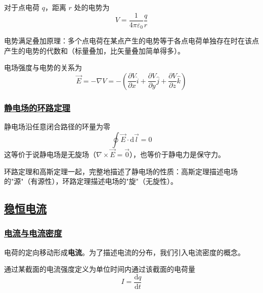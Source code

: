 对于点电荷 $q$，距离 $r$ 处的电势为
\begin{equation}
    V = \frac{1}{4\pi\varepsilon_0}\frac{q}{r}
\end{equation}

电势满足叠加原理：多个点电荷在某点产生的电势等于各点电荷单独存在时在该点产生的电势的代数和（标量叠加，比矢量叠加简单得多）。

电场强度与电势的关系为
\begin{equation}
    \vec{E} = -\nabla V = -\left(\frac{\partial V}{\partial x}\hat{i} + \frac{\partial V}{\partial y}\hat{j} + \frac{\partial V}{\partial z}\hat{k}\right)
\end{equation}

\subsubsection{\protect\hyperlink{:}{静电场的环路定理}}

\begin{theorem}[静电场的环路定理]
    静电场沿任意闭合路径的环量为零
    \begin{equation}
        \oint \vec{E} \cdot \mathrm{d}\vec{l} = 0
    \end{equation}
    这等价于说静电场是无旋场（$\nabla \times \vec{E} = \vec{0}$），也等价于静电力是保守力。
\end{theorem}

环路定理和高斯定理一起，完整地描述了静电场的性质：高斯定理描述电场的"源"（有源性），环路定理描述电场的"旋"（无旋性）。


\subsection{\protect\hyperlink{:}{稳恒电流}}

\subsubsection{\protect\hyperlink{:}{电流与电流密度}}

电荷的定向移动形成\textbf{电流}。为了描述电流的分布，我们引入电流密度的概念。

\begin{definition}[电流强度]
    通过某截面的电流强度定义为单位时间内通过该截面的电荷量
    \begin{equation}
        I = \frac{\mathrm{d}q}{\mathrm{d}t}
    \end{equation}
\end{definition}

